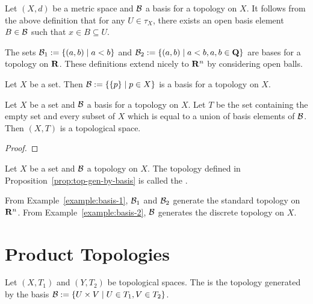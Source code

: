 \begin{remark}
    Let $(X,d)$ be a metric space and $\mathcal{B}$ a basis for a topology on $X$. It follows from the above definition that for any $U \in \tau_X$, there exists an open basis element $B \in \mathcal{B}$ such that $x \in B \subseteq U$.
\end{remark}

\begin{example}\label{example:basis-1}
    The sets $\mathcal{B}_1 := \{(a,b) \mid a<b\}$ and $\mathcal{B}_2 := \{(a,b) \mid a < b, a,b \in \mathbf{Q}\}$ are bases for a topology on $\mathbf{R}$. These definitions extend nicely to $\mathbf{R}^n$ by considering open balls.
\end{example}

\begin{example}\label{example:basis-2}
    Let $X$ be a set. Then $\mathcal{B} := \{\{p\} \mid p \in X\}$ is a basis for a topology on $X$.
\end{example}

\begin{proposition}\label{prop:top-gen-by-basis}
    Let $X$ be a set and $\mathcal{B}$ a basis for a topology on $X$. Let $T$ be the set containing the empty set and every subset of $X$ which is equal to a union of basis elements of $\mathcal{B}$. Then $(X,T)$ is a topological space.
\end{proposition}
    {\color{red} \begin{proof}
        
    \end{proof}}

\begin{definition}
    Let $X$ be a set and $\mathcal{B}$ a topology on $X$. The topology defined in Proposition~\ref{prop:top-gen-by-basis} is called the .
\end{definition}

\begin{example}
    From Example~\ref{example:basis-1}, $\mathcal{B}_1$ and $\mathcal{B}_2$ generate the standard topology on $\mathbf{R}^n$. From Example~\ref{example:basis-2}, $\mathcal{B}$ generates the discrete topology on $X$.
\end{example}

\section{Product Topologies}

\begin{definition}
    Let $(X,T_1)$ and $(Y,T_2)$ be topological spaces. The  is the topology generated by the basis $\mathcal{B} := \{U \times V \mid U \in T_1, V \in T_2\}$.
\end{definition}

